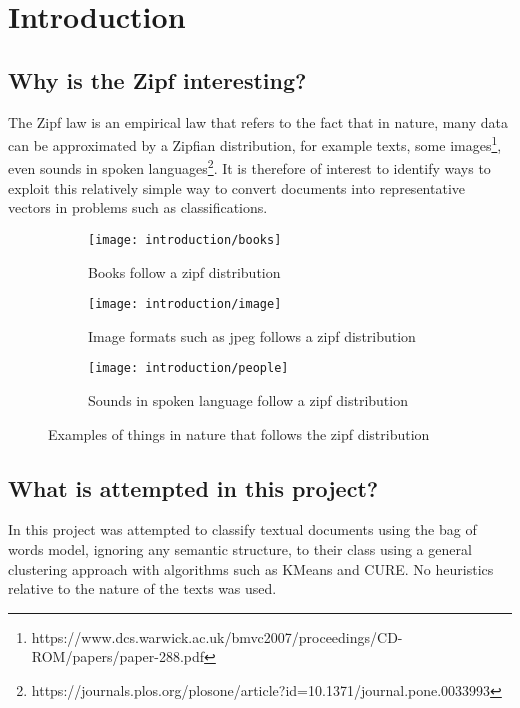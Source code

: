 \documentclass[\main/main.tex]{subfiles}
\begin{document}
\chapter{Introduction}
\section{Why is the Zipf interesting?}
The Zipf law is an empirical law that refers to the fact that in nature, many data can be approximated by a Zipfian distribution, for example texts, some images\footnote{https://www.dcs.warwick.ac.uk/bmvc2007/proceedings/CD-ROM/papers/paper-288.pdf}, even sounds in spoken languages\footnote{https://journals.plos.org/plosone/article?id=10.1371/journal.pone.0033993}. It is therefore of interest to identify ways to exploit this relatively simple way to convert documents into representative vectors in problems such as classifications.

\begin{figure}
  \begin{subfigure}{0.32\textwidth}
    \texttt{[image: introduction/books]}
    \caption{Books follow a zipf distribution}
  \end{subfigure}
  \begin{subfigure}{0.32\textwidth}
    \texttt{[image: introduction/image]}
    \caption{Image formats such as jpeg follows a zipf distribution}
  \end{subfigure}
  \begin{subfigure}{0.32\textwidth}
    \texttt{[image: introduction/people]}
    \caption{Sounds in spoken language follow a zipf distribution}
  \end{subfigure}
  \caption{Examples of things in nature that follows the zipf distribution}
\end{figure}

\section{What is attempted in this project?}
In this project was attempted to classify textual documents using the bag of words model, ignoring any semantic structure, to their class using a general clustering approach with algorithms such as KMeans and CURE. No heuristics relative to the nature of the texts was used.
\end{document}
